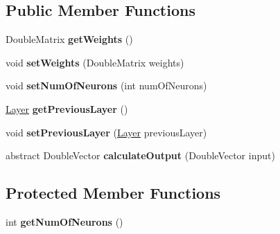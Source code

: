 \subsection*{Public Member Functions}
\begin{DoxyCompactItemize}
\item 
\hypertarget{classhr_1_1java_1_1_j_m_l_1_1neural_1_1_layer_ae470877e735c0b6bfd5a6d8b1bf3fcc9}{Double\+Matrix {\bfseries get\+Weights} ()}\label{classhr_1_1java_1_1_j_m_l_1_1neural_1_1_layer_ae470877e735c0b6bfd5a6d8b1bf3fcc9}

\item 
\hypertarget{classhr_1_1java_1_1_j_m_l_1_1neural_1_1_layer_a1bf91d8706c06b60d8d1203e987789eb}{void {\bfseries set\+Weights} (Double\+Matrix weights)}\label{classhr_1_1java_1_1_j_m_l_1_1neural_1_1_layer_a1bf91d8706c06b60d8d1203e987789eb}

\item 
\hypertarget{classhr_1_1java_1_1_j_m_l_1_1neural_1_1_layer_a4d7bb35c7f199394e78505be25776921}{void {\bfseries set\+Num\+Of\+Neurons} (int num\+Of\+Neurons)}\label{classhr_1_1java_1_1_j_m_l_1_1neural_1_1_layer_a4d7bb35c7f199394e78505be25776921}

\item 
\hypertarget{classhr_1_1java_1_1_j_m_l_1_1neural_1_1_layer_a2a4aa1798db11a68b53c794fc929dc25}{\hyperlink{classhr_1_1java_1_1_j_m_l_1_1neural_1_1_layer}{Layer} {\bfseries get\+Previous\+Layer} ()}\label{classhr_1_1java_1_1_j_m_l_1_1neural_1_1_layer_a2a4aa1798db11a68b53c794fc929dc25}

\item 
\hypertarget{classhr_1_1java_1_1_j_m_l_1_1neural_1_1_layer_a92c6d1c7f94f8c99e66413ed40e74685}{void {\bfseries set\+Previous\+Layer} (\hyperlink{classhr_1_1java_1_1_j_m_l_1_1neural_1_1_layer}{Layer} previous\+Layer)}\label{classhr_1_1java_1_1_j_m_l_1_1neural_1_1_layer_a92c6d1c7f94f8c99e66413ed40e74685}

\item 
\hypertarget{classhr_1_1java_1_1_j_m_l_1_1neural_1_1_layer_a2886a423c2f26b7b197ecac8dd2dcefb}{abstract Double\+Vector {\bfseries calculate\+Output} (Double\+Vector input)}\label{classhr_1_1java_1_1_j_m_l_1_1neural_1_1_layer_a2886a423c2f26b7b197ecac8dd2dcefb}

\end{DoxyCompactItemize}
\subsection*{Protected Member Functions}
\begin{DoxyCompactItemize}
\item 
\hypertarget{classhr_1_1java_1_1_j_m_l_1_1neural_1_1_layer_af1af131c8ce496ee145fe366a816ea07}{int {\bfseries get\+Num\+Of\+Neurons} ()}\label{classhr_1_1java_1_1_j_m_l_1_1neural_1_1_layer_af1af131c8ce496ee145fe366a816ea07}

\end{DoxyCompactItemize}
